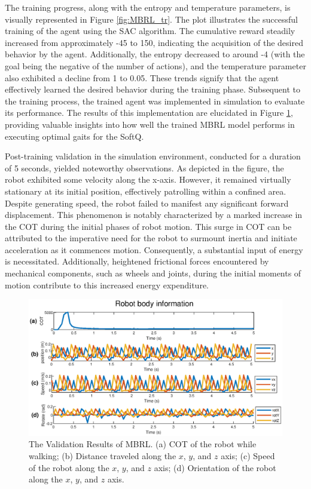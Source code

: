 The training progress, along with the entropy and temperature parameters, is visually represented in Figure \ref{fig:MBRL_tr}. The plot illustrates the successful training of the agent using the SAC algorithm. The cumulative reward steadily increased from approximately -45 to 150, indicating the acquisition of the desired behavior by the agent. Additionally, the entropy decreased to around -4 (with the goal being the negative of the number of actions), and the temperature parameter also exhibited a decline from 1 to 0.05. These trends signify that the agent effectively learned the desired behavior during the training phase. Subsequent to the training process, the trained agent was implemented in simulation to evaluate its performance. The results of this implementation are elucidated in Figure \ref{fig:MBRL_val}, providing valuable insights into how well the trained MBRL model performs in executing optimal gaits for the SoftQ. 

Post-training validation in the simulation environment, conducted for a duration of 5 seconds, yielded noteworthy observations. As depicted in the figure, the robot exhibited some velocity along the x-axis. However, it remained virtually stationary at its initial position, effectively patrolling within a confined area. Despite generating speed, the robot failed to manifest any significant forward displacement. This phenomenon is notably characterized by a marked increase in the \ac{COT} during the initial phases of robot motion. This surge in \ac{COT} can be attributed to the imperative need for the robot to surmount inertia and initiate acceleration as it commences motion. Consequently, a substantial input of energy is necessitated. Additionally, heightened frictional forces encountered by mechanical components, such as wheels and joints, during the initial moments of motion contribute to this increased energy expenditure.

\begin{figure}[htb]
    \centering
    \includegraphics[width=\linewidth]{img/chap5/MBRL_val.eps}
    \caption{The Validation Results of MBRL. (a) COT of the robot while walking; (b) Distance traveled along the $x$, $y$, and $z$ axis; (c) Speed of the robot along the $x$, $y$, and $z$ axis; (d) Orientation of the robot along the $x$, $y$, and $z$ axis.}
    \label{fig:MBRL_val}
\end{figure}

